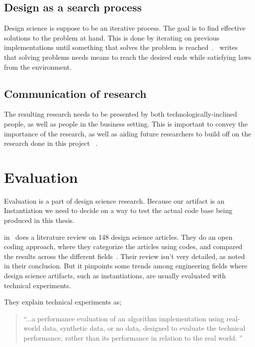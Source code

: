 \documentclass[../Main/thesis.tex]{subfiles}
\begin{document}
\subsection*{Design as a search process}%
\label{sub:design_as_a_search_process}
Design science is suppose to be an iterative process. The goal is to find
effective solutions to the problem at hand. This is done by iterating on
previous implementations until something that solves the problem is
reached~\cite{Hevner:2004:DSI:2017212.2017217}.~\citeauthor{Hevner:2004:DSI:2017212.2017217}
writes that solving problems needs means to reach the desired ends while
satisfying laws from the environment.

\subsection*{Communication of research}%
\label{sub:communication_of_research}
The resulting research needs to be presented by both technologically-inclined
people, as well as people in the business setting. This is important to convey
the importance of the research, as well as aiding future researchers to build
off on the research done in this project ~\cite{Hevner:2004:DSI:2017212.2017217}.


\section{Evaluation}%
\label{sec:methodology_evaluation}
Evaluation is a part of design science research. Because our artifact is an
Instantiation we need to decide on a way to test the actual code base being
produced in this thesis.

\citeauthor{Peffers:2012:DSR:2342209.2342243}
in~ does a literature review on 148
design science articles. They do an open coding approach, where they categorize
the articles using codes, and compared the results across the different
fields~\cite{Peffers:2012:DSR:2342209.2342243}. Their review isn't very
detailed, as noted in their conclusion. But it pinpoints some trends among
engineering fields where design science artifacts, such as instantiations,
are usually evaluated with technical experiments.

They explain technical experiments as;
\begin{quotation}
    ``...a performance evaluation of an algorithm implementation using real-world
    data, synthetic data, or no data, designed to evaluate the technical
    performance, rather than its performance in relation to the real world.
    ''~\cite[p.~402]{Peffers:2012:DSR:2342209.2342243}
\end{quotation}
\end{document}
